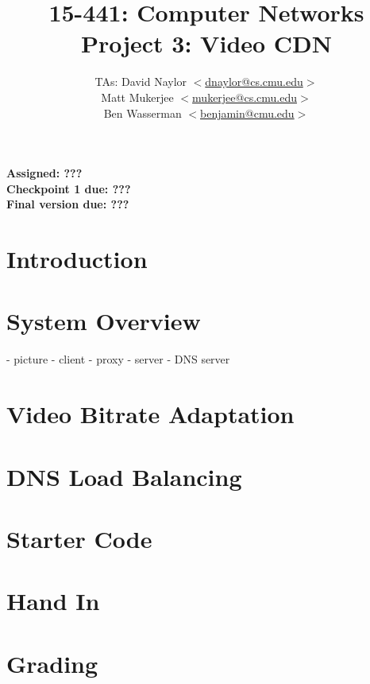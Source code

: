 \documentclass{article}
\title{	15-441: Computer Networks\\
Project 3: Video CDN\\
}
\author{TAs: David Naylor
             $<$\href{mailto:dnaylor@cs.cmu.edu}{dnaylor@cs.cmu.edu}$>$ \\
             Matt Mukerjee
             $<$\href{mailto:mukerjee@cs.cmu.edu}{mukerjee@cs.cmu.edu}$>$ \\ 
			 Ben Wasserman
             $<$\href{mailto:benjamin@cmu.edu}{benjamin@cmu.edu}$>$}
\date{}
\begin{document}
\maketitle

\large{\noindent \textbf{Assigned: ???\\
Checkpoint 1 due: ???\\
Final version due: ???}}


\section{Introduction}


\section{System Overview}

- picture
- client
- proxy
- server
- DNS server


\section{Video Bitrate Adaptation}


\section{DNS Load Balancing}


\section{Starter Code}


\section{Hand In}


\section{Grading}
\end{document}
